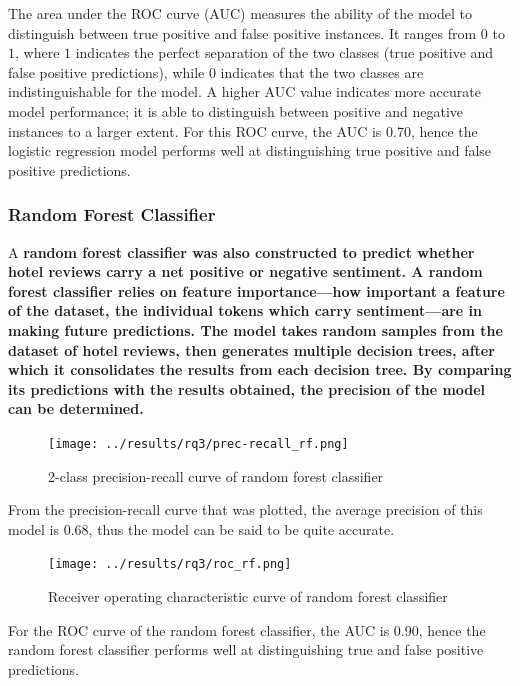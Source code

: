 \documentclass[12pt,bibliography=totocnumbered]{scrartcl}
\begin{document}
{The area under the ROC curve (AUC) measures the ability of the model to
distinguish between true positive and false positive instances. It ranges
from $0$ to $1$, where $1$ indicates the perfect separation of the two classes
(true positive and false positive predictions), while $0$ indicates that the two classes
are indistinguishable for the model. A higher AUC value indicates more accurate model
performance; it is able to distinguish between positive and negative instances to a
larger extent. For this ROC curve, the AUC is $0$.70, hence the logistic regression model
performs well at distinguishing true positive and false positive predictions.

\subsubsection{Random Forest Classifier}
A \bf{random forest classifier} was also constructed to predict
whether hotel reviews carry a net positive or negative sentiment.
A random forest classifier relies on feature importance---how important a feature of
the dataset, the individual tokens which carry sentiment---are in making future predictions.
The model takes random samples from the dataset of hotel reviews, then generates
multiple decision trees, after which it consolidates the results from each decision tree.
By comparing its predictions with the results obtained, the precision of the model can be
determined.

\begin{figure}[htpb]
	\begin{center}
		\texttt{[image: ../results/rq3/prec-recall\_rf.png]}
	\end{center}
	\caption{2-class precision-recall curve of random forest classifier}
	\label{fig:rf-prcurve}
\end{figure}

From the precision-recall curve that was plotted, the average precision
of this model is $0.68$, thus the model can be said to be quite accurate.

\begin{figure}[htpb]
	\begin{center}
		\texttt{[image: ../results/rq3/roc\_rf.png]}
	\end{center}
	\caption{Receiver operating characteristic curve of random forest classifier}
	\label{fig:rf-roc}
\end{figure}

For the ROC curve of the random forest classifier, the AUC is 0.90, hence
the random forest classifier performs well at distinguishing true and false
positive predictions.

}
\end{document}

